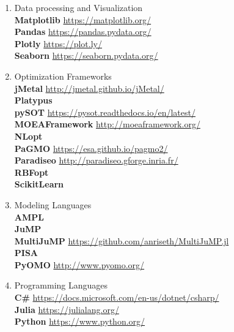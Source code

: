 \begin{enumerate}[label=\Alph*]
\item Data processing and Visualization \\
\textbf{Matplotlib} \url{https://matplotlib.org/} \\
\textbf{Pandas} \url{https://pandas.pydata.org/} \\
\textbf{Plotly} \url{https://plot.ly/} \\
\textbf{Seaborn} \url{https://seaborn.pydata.org/}

\item Optimization Frameworks\\
\textbf{jMetal} \url{http://jmetal.github.io/jMetal/} \\
\textbf{Platypus} \cite{platypus} \\
\textbf{pySOT} \url{https://pysot.readthedocs.io/en/latest/} \\
\textbf{MOEAFramework} \url{http://moeaframework.org/} \\
\textbf{NLopt} \cite{NLOPT} \\
\textbf{PaGMO} \url{https://esa.github.io/pagmo2/} \\
\textbf{Paradiseo} \url{http://paradiseo.gforge.inria.fr/} \\
\textbf{RBFopt} \cite{RBFOPT} \\ 
\textbf{ScikitLearn} \cite{scikit-learn} 

\item Modeling Languages  \\
\textbf{AMPL} \cite{AMPL} \\
\textbf{JuMP} \cite{DunningHuchetteLubin2017} \\
\textbf{MultiJuMP} \url{https://github.com/anriseth/MultiJuMP.jl} \\
\textbf{PISA} \cite{PISA2003} \\
\textbf{PyOMO} \url{http://www.pyomo.org/}

\item Programming Languages \\
\textbf{C\#} \url{https://docs.microsoft.com/en-us/dotnet/csharp/} \\
\textbf{Julia} \url{https://julialang.org/} \\
\textbf{Python} \url{https://www.python.org/}

\end{enumerate}